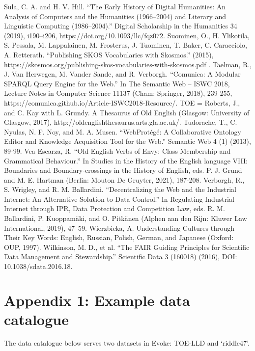 Sula, C. A. and H. V. Hill. “The Early History of Digital Humanities: An Analysis of Computers and the Humanities (1966–2004) and Literary and Linguistic Computing (1986–2004).” Digital Scholarship in the Humanities 34 (2019), i190–i206, https://doi.org/10.1093/llc/fqz072.
Suominen, O., H. Ylikotila, S. Pessala, M. Lappalainen, M. Frosterus, J. Tuominen, T. Baker, C. Caracciolo, A. Retterath. “Publishing SKOS Vocabularies with Skosmos.” (2015), https://skosmos.org/publishing-skos-vocabularies-with-skosmos.pdf .
Taelman, R., J. Van Herwegen, M. Vander Sande, and R. Verborgh. “Comunica: A Modular SPARQL Query Engine for the Web.” In The Semantic Web – ISWC 2018, Lecture Notes in Computer Science 11137 (Cham: Springer, 2018), 239-255, https://comunica.github.io/Article-ISWC2018-Resource/.
TOE = Roberts, J., and C. Kay with L. Grundy. A Thesaurus of Old English (Glasgow: University of Glasgow, 2017), http://oldenglishthesaurus.arts.gla.ac.uk/.
Tudorache, T., C. Nyulas, N. F. Noy, and M. A. Musen. “WebProtégé: A Collaborative Ontology Editor and Knowledge Acquisition Tool for the Web.” Semantic Web 4 (1) (2013), 89-99.
Vea Escarza, R. “Old English Verbs of Envy: Class Membership and Grammatical Behaviour.” In Studies in the History of the English language VIII: Boundaries and Boundary-crossings in the History of English, eds. P. J. Grund and M. E. Hartman (Berlin: Mouton De Gruyter, 2021), 187-208.
Verborgh, R., S. Wrigley, and R. M. Ballardini. “Decentralizing the Web and the Industrial Internet: An Alternative Solution to Data Control.” In Regulating Industrial Internet through IPR, Data Protection and Competition Law, eds. R. M. Ballardini, P. Kuoppamäki, and O. Pitkänen (Alphen aan den Rijn: Kluwer Law International, 2019), 47–59.
Wierzbicka, A. Understanding Cultures through Their Key Words: English, Russian, Polish, German, and Japanese (Oxford: OUP, 1997).
Wilkinson, M. D., et al. “The FAIR Guiding Principles for Scientific Data Management and Stewardship.” Scientific Data 3 (160018) (2016), DOI: 10.1038/sdata.2016.18.

\section{Appendix 1: Example data catalogue}
The data catalogue below serves two datasets in Evoke: TOE-LLD and ‘riddle47’.

